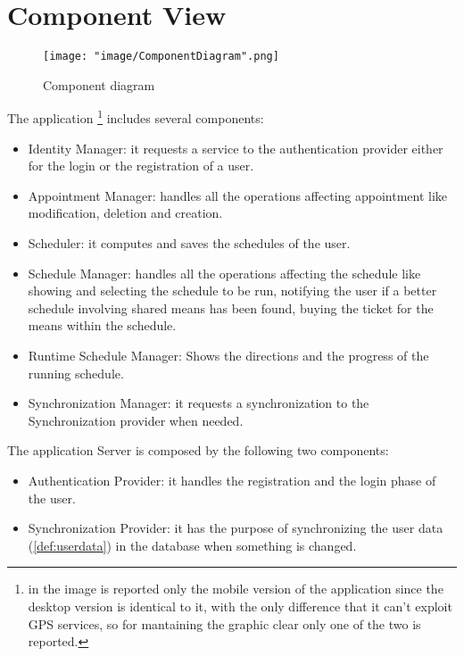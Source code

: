 \section{Component View}

\begin{figure}[H]
\begin{center}
\texttt{[image: "image/ComponentDiagram".png]}
\caption{Component diagram}
\end{center}
\end{figure}


The application \footnote{in the image is reported only the mobile version of the application since the desktop version is identical to it, with the only difference that it can't exploit GPS services, so for mantaining the graphic clear only one of the two is reported.}
includes several components: 
\begin{itemize}

\item Identity Manager: it requests a service to the authentication provider either for the login or the registration of a user. 

\item Appointment Manager: handles all the operations affecting appointment like modification, deletion and creation.
 
\item Scheduler: it computes and saves the schedules of the user.

\item Schedule Manager: handles all the operations affecting the schedule like showing and selecting the schedule to be run, notifying the user if a better schedule involving shared means has been found, buying the ticket for the means within the schedule. 

\item Runtime Schedule Manager: Shows the directions and the progress of the running schedule.

\item Synchronization Manager: it requests a synchronization to the Synchronization provider when needed.  

\end{itemize}

The application Server is composed by the following two components:
\begin{itemize}

\item Authentication Provider: it handles the registration and the login phase of the user. 

\item Synchronization Provider: it has the purpose of synchronizing the user data (\ref{def:userdata}) in the database when something is changed.
 
\end{itemize}

